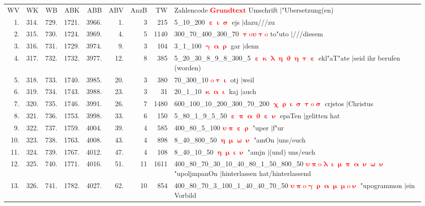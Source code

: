 \documentclass[a4paper,10pt,landscape]{article}
\begin{document}
\begin{tabular}{rrrrrrrrp{120mm}}
WV&WK&WB&ABK&ABB&ABV&AnzB&TW&Zahlencode \textcolor{red}{$\boldsymbol{Grundtext}$} Umschrift $|$"Ubersetzung(en)\\
1.&314.&729.&1721.&3966.&1.&3&215&5\_10\_200 \textcolor{red}{$\boldsymbol{\upepsilon\upiota\upsigma}$} ejs $|$dazu///zu\\
2.&315.&730.&1724.&3969.&4.&5&1140&300\_70\_400\_300\_70 \textcolor{red}{$\boldsymbol{\uptau\mathrm{o}\upsilon\uptau\mathrm{o}}$} to"uto $|$///diesem\\
3.&316.&731.&1729.&3974.&9.&3&104&3\_1\_100 \textcolor{red}{$\boldsymbol{\upgamma\upalpha\uprho}$} gar $|$denn\\
4.&317.&732.&1732.&3977.&12.&8&385&5\_20\_30\_8\_9\_8\_300\_5 \textcolor{red}{$\boldsymbol{\upepsilon\upkappa\uplambda\upeta\upvartheta\upeta\uptau\upepsilon}$} ekl"aT"ate $|$seid ihr berufen (worden)\\
5.&318.&733.&1740.&3985.&20.&3&380&70\_300\_10 \textcolor{red}{$\boldsymbol{\mathrm{o}\uptau\upiota}$} otj $|$weil\\
6.&319.&734.&1743.&3988.&23.&3&31&20\_1\_10 \textcolor{red}{$\boldsymbol{\upkappa\upalpha\upiota}$} kaj $|$auch\\
7.&320.&735.&1746.&3991.&26.&7&1480&600\_100\_10\_200\_300\_70\_200 \textcolor{red}{$\boldsymbol{\upchi\uprho\upiota\upsigma\uptau\mathrm{o}\upsigma}$} crjstos $|$Christus\\
8.&321.&736.&1753.&3998.&33.&6&150&5\_80\_1\_9\_5\_50 \textcolor{red}{$\boldsymbol{\upepsilon\uppi\upalpha\upvartheta\upepsilon\upnu}$} epaTen $|$gelitten hat\\
9.&322.&737.&1759.&4004.&39.&4&585&400\_80\_5\_100 \textcolor{red}{$\boldsymbol{\upsilon\uppi\upepsilon\uprho}$} "uper $|$f"ur\\
10.&323.&738.&1763.&4008.&43.&4&898&8\_40\_800\_50 \textcolor{red}{$\boldsymbol{\upeta\upmu\upomega\upnu}$} "amOn $|$uns/euch\\
11.&324.&739.&1767.&4012.&47.&4&108&8\_40\_10\_50 \textcolor{red}{$\boldsymbol{\upeta\upmu\upiota\upnu}$} "amjn $|$(und) uns/euch\\
12.&325.&740.&1771.&4016.&51.&11&1611&400\_80\_70\_30\_10\_40\_80\_1\_50\_800\_50 \textcolor{red}{$\boldsymbol{\upsilon\uppi\mathrm{o}\uplambda\upiota\upmu\uppi\upalpha\upnu\upomega\upnu}$} "upoljmpanOn $|$hinterlassen hat/hinterlassend\\
13.&326.&741.&1782.&4027.&62.&10&854&400\_80\_70\_3\_100\_1\_40\_40\_70\_50 \textcolor{red}{$\boldsymbol{\upsilon\uppi\mathrm{o}\upgamma\uprho\upalpha\upmu\upmu\mathrm{o}\upnu}$} "upogrammon $|$ein Vorbild\\

\end{tabular}
\end{document}
